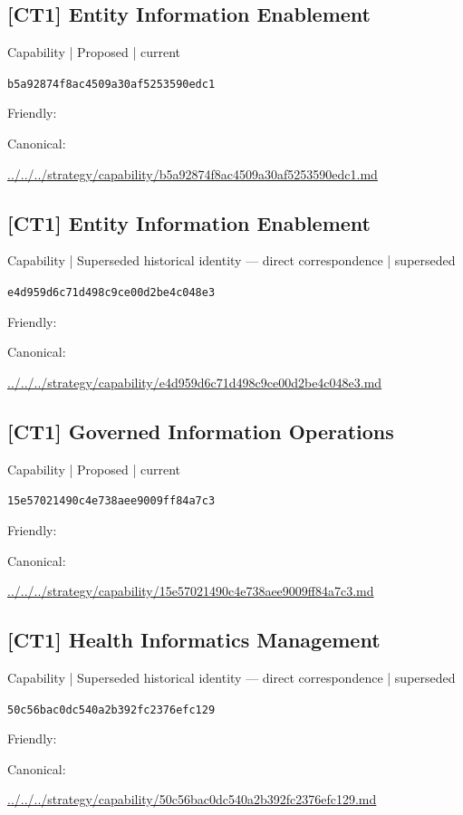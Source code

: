 \documentclass[10pt,a4paper]{article}
\begin{document}
\subsection*{[CT1] Entity Information Enablement}
{\small Capability | Proposed | current}\par
\texttt{b5a92874f8ac4509a30af5253590edc1}\par
Friendly: \par
Canonical: \par
{\footnotesize\url{../../../strategy/capability/b5a92874f8ac4509a30af5253590edc1.md}}\par
\subsection*{[CT1] Entity Information Enablement}
{\small Capability | Superseded historical identity — direct correspondence | superseded}\par
\texttt{e4d959d6c71d498c9ce00d2be4c048e3}\par
Friendly: \par
Canonical: \par
{\footnotesize\url{../../../strategy/capability/e4d959d6c71d498c9ce00d2be4c048e3.md}}\par
\subsection*{[CT1] Governed Information Operations}
{\small Capability | Proposed | current}\par
\texttt{15e57021490c4e738aee9009ff84a7c3}\par
Friendly: \par
Canonical: \par
{\footnotesize\url{../../../strategy/capability/15e57021490c4e738aee9009ff84a7c3.md}}\par
\subsection*{[CT1] Health Informatics Management}
{\small Capability | Superseded historical identity — direct correspondence | superseded}\par
\texttt{50c56bac0dc540a2b392fc2376efc129}\par
Friendly: \par
Canonical: \par
{\footnotesize\url{../../../strategy/capability/50c56bac0dc540a2b392fc2376efc129.md}}\par
\end{document}
